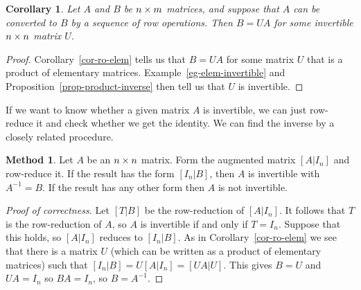 \documentclass[reqno]{amsart}
\newtheorem{corollary}[theorem]{Corollary}
\theoremstyle{definition}
\newtheorem{method}[theorem]{Method}
\begin{document}
\begin{corollary}\label{cor-ro-elem-ii}
 Let $A$ and $B$ be $n\times m$ matrices, and suppose that $A$ can be
 converted to $B$ by a sequence of row operations.  Then $B=UA$ for
 some invertible $n\times n$ matrix $U$.
\end{corollary}
\begin{proof}
 Corollary~\ref{cor-ro-elem} tells us that $B=UA$ for some matrix $U$
 that is a product of elementary matrices.
 Example~\ref{eg-elem-invertible} and
 Proposition~\ref{prop-product-inverse} then tell us that $U$ is
 invertible.  
\end{proof}

If we want to know whether a given matrix $A$ is invertible, we can
just row-reduce it and check whether we get the identity.  We can find
the inverse by a closely related procedure.

\begin{method}\label{meth-find-inverse}
 Let $A$ be an $n\times n$ matrix.  Form the augmented matrix $[A|I_n]$
 and row-reduce it.  If the result has the form $[I_n|B]$, then $A$ is
 invertible with $A^{-1}=B$.  If the result has any other form then
 $A$ is not invertible.
\end{method}

\begin{proof}[Proof of correctness]
 Let $[T|B]$ be the row-reduction of $[A|I_n]$.  It follows that $T$
 is the row-reduction of $A$, so $A$ is invertible if and only if
 $T=I_n$.  Suppose that this holds, so $[A|I_n]$ reduces to $[I_n|B]$.
 As in Corollary~\ref{cor-ro-elem} we see that there is a matrix $U$
 (which can be written as a product of elementary matrices) such that
 $[I_n|B]=U[A|I_n]=[UA|U]$.  This gives $B=U$ and $UA=I_n$ so
 $BA=I_n$, so $B=A^{-1}$.
\end{proof}
\end{document}
